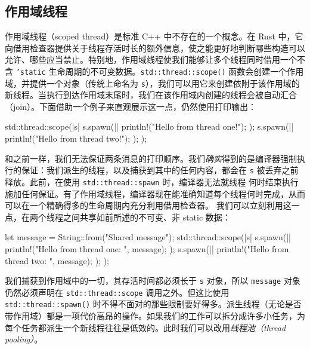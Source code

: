 \subsection{作用域线程}
\label{idx:idx_105f2f98}
\label{idx:idx_6c040b37}
作用域线程（scoped thread）是标准 C++ 中不存在的一个概念。在 Rust 中，它向借用检查器提供关于线程存活时长的额外信息，使之能更好地判断哪些构造可以允许、哪些应当禁止。特别地，作用域线程使我们能够让多个线程同时借用一个不含 \texttt{'static} 生命周期的不可变数据。\texttt{std::\allowbreak{}thread::\allowbreak{}scope(\allowbreak{})\allowbreak{}} 函数会创建一个作用域，并提供一个对象（传统上命名为 \texttt{s}），我们可以用它来创建依附于该作用域的新线程。当执行到达作用域末尾时，我们在该作用域内创建的线程会被自动汇合（join）。下面借助一个例子来直观展示这一点，仍然使用打印输出：
\begin{codebox}[rust]
std::thread::scope(|s| {
    s.spawn(|| {
        println!("Hello from thread one!");
    });
    s.spawn(|| {
        println!("Hello from thread two!");
    });
});
\end{codebox}
和之前一样，我们无法保证两条消息的打印顺序。我们\emph{确实}得到的是编译器强制执行的保证：我们派生的线程，以及捕获到其中的任何内容，都会在 \texttt{s} 被丢弃之前释放。此前，在使用
\texttt{std::\allowbreak{}thread::\allowbreak{}spawn} 时，编译器无法就线程
\label{idx:idx_ec78f9e5}
\label{idx:idx_f788c16a}
何时结束执行施加任何保证。有了作用域线程，编译器现在能准确知道每个线程何时完成，从而可以在一个精确得多的生命周期内充分利用借用检查器。
我们可以立刻利用这一点，在两个线程之间共享如前所述的不可变、非 static 数据：
\begin{codebox}[rust]
let message = String::from("Shared message");
std::thread::scope(|s| {
    s.spawn(|| {
        println!("Hello from thread one: {}", message);
    });
    s.spawn(|| {
        println!("Hello from thread two: {}", message);
    });
});
\end{codebox}
我们捕获到作用域中的一切，其存活时间都必须长于 \texttt{s} 对象，所以 \texttt{message} 对象仍然必须声明在 \texttt{std::\allowbreak{}thread::\allowbreak{}scope} 调用之外。但这比使用 \texttt{std::\allowbreak{}thread::\allowbreak{}spawn(\allowbreak{})\allowbreak{}} 时不得不面对的那些限制要好得多。派生线程（无论是否带作用域）都是一项代价高昂的操作。如果我们的工作可以拆分成许多小任务，为每个任务都派生一个新线程往往是低效的。此时我们可以改用\emph{线程池（thread pooling）}。
